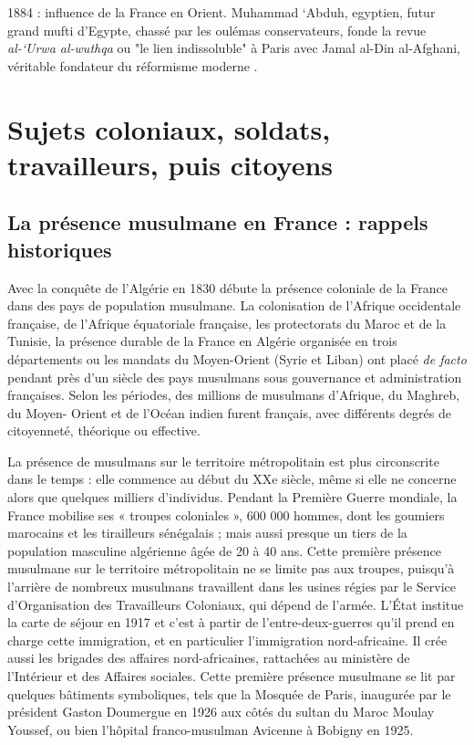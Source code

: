 1884 : influence de la France en Orient. Muhammad ‘Abduh, egyptien, futur grand mufti d'Egypte, chassé par les oulémas conservateurs, fonde la revue \emph{al-‘Urwa al-wuthqa} ou "le lien indissoluble" à Paris avec Jamal al-Din al-Afghani, véritable fondateur du réformisme moderne .



\section{Sujets coloniaux, soldats, travailleurs, puis citoyens}


\subsection{La présence musulmane en France : rappels historiques}


Avec la conquête de l'Algérie en 1830 débute la présence coloniale de la
France dans des pays de population musulmane. La colonisation de
l'Afrique occidentale française, de l'Afrique équatoriale française, les
protectorats du Maroc et de la Tunisie, la présence durable de la France
en Algérie organisée en trois départements ou les mandats du
Moyen-Orient (Syrie et Liban) ont placé \emph{de facto} pendant près
d'un siècle des pays musulmans sous gouvernance et administration
françaises. Selon les périodes, des millions de musulmans d'Afrique, du
Maghreb, du Moyen- Orient et de l'Océan indien furent français, avec
différents degrés de citoyenneté, théorique ou effective.

La présence de musulmans sur le territoire métropolitain est plus
circonscrite dans le temps : elle commence au début du XXe siècle, même
si elle ne concerne alors que quelques milliers d'individus. Pendant la
Première Guerre mondiale, la France mobilise ses « troupes coloniales »,
600 000 hommes, dont les goumiers marocains et les tirailleurs
sénégalais ; mais aussi presque un tiers de la population masculine
algérienne âgée de 20 à 40 ans. Cette première présence musulmane sur le
territoire métropolitain ne se limite pas aux troupes, puisqu'à
l'arrière de nombreux musulmans travaillent dans les usines régies par
le Service d'Organisation des Travailleurs Coloniaux, qui dépend de
l'armée. L'État institue la carte de séjour en 1917 et c'est à partir de
l'entre-deux-guerres qu'il prend en charge cette immigration, et en
particulier l'immigration nord-africaine. Il crée aussi les brigades des
affaires nord-africaines, rattachées au ministère de l'Intérieur et des
Affaires sociales. Cette première présence musulmane se lit par quelques
bâtiments symboliques, tels que la Mosquée de Paris, inaugurée par le
président Gaston Doumergue en 1926 aux côtés du sultan du Maroc Moulay
Youssef, ou bien l'hôpital franco-musulman Avicenne à Bobigny en 1925.

